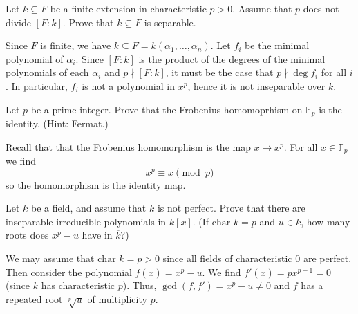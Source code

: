 \documentclass[../../master.tex]{subfiles}
\begin{document}
\begin{problem}
    Let $k \subseteq F$ be a finite extension in characteristic $p > 0$.
    Assume that $p$ does not divide $[F : k]$.
    Prove that $k \subseteq F$ is separable.
\end{problem}

\begin{solution}
    Since $F$ is finite, we have $k \subseteq F = k(\alpha_1, \ldots, \alpha_n)$.
    Let $f_i$ be the minimal polynomial of $\alpha_i$.
    Since $[F : k]$ is the product of the degrees of the minimal polynomials of each  $\alpha_i$ and $p \nmid [F : k]$, it must be the case that $p \nmid \deg f_i$ for all $i$.
    In particular, $f_i$ is not a polynomial in $x^{p}$, hence it is not inseparable over $k$.
\end{solution}

\begin{problem}
    Let $p$ be a prime integer.
    Prove that the Frobenius homomoprhism on $\mathbb{F}_p$ is the identity.
    (Hint: Fermat.)
\end{problem}

\begin{solution}
    Recall that that the Frobenius homomorphism is the map $x \mapsto x^{p}$.
    For all $x \in \mathbb{F}_p$ we find
    \[
    x^{p} \equiv x \pmod p
    \]
    so the homomorphism is the identity map.
\end{solution}

\begin{problem}
    Let $k$ be a field, and assume that $k$ is not perfect.
    Prove that there are inseparable irreducible polynomials in $k[x]$.
    (If $\text{char } k = p$ and $u \in k$, how many roots does $x^{p} - u$ have in $\overline{k}$?)
\end{problem}

\begin{solution}
    We may assume that $\text{char } k = p > 0$ since all fields of characteristic 0 are perfect.
    Then consider the polynomial $f(x) = x^{p} - u$.
    We find $f'(x) = px^{p-1} = 0$ (since $k$ has characteristic $p$).
    Thus, $\gcd(f, f') = x^{p} - u \neq 0$ and $f$ has a repeated root $\sqrt[p]{u}$ of multiplicity $p$.
\end{solution}
\end{document}
